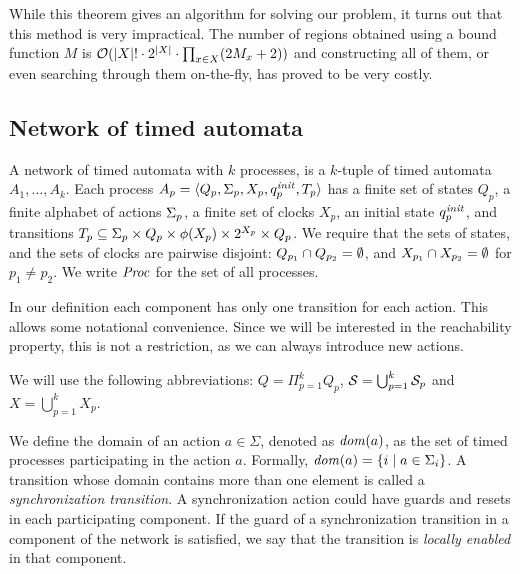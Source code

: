 While this theorem gives an algorithm for solving our problem, it turns out that this method is very impractical. The number of regions obtained using a bound function $M$ is $\calO (|X|! \cdot 2^{|X|} \cdot \prod_{x \in X} (2M_x + 2))$ \cite{} and constructing all of them, or even searching through them on-the-fly, has proved to be very costly.

\subsection{Network of timed automata}

\begin{definition}\label{df:network}
    A network of timed automata with $k$ processes, is a $k$-tuple of
    timed automata $A_1,\dots,A_k$.  Each process
    $A_p=\struct{Q_p,\S_p,X_p,q^\init_p,T_p}$ has a finite set of states
    $Q_p$, a finite alphabet of actions $\S_p$, a finite set of clocks
    $X_p$, an initial state $q^\init_p$, and transitions
    $T_p\incl\S_p\times Q_p\times \phi(X_p)\times 2^{X_p}\times Q_p$.  We
    require that the sets of states, and the sets of clocks are pairwise
    disjoint: $Q_{p_1}\cap Q_{p_2}=\es$, and $X_{p_1}\cap X_{p_2}=\es$
    for $p_1\not=p_2$. We write $\Proc$ for the set of all processes.
  \end{definition}
  
  \begin{remark}
    In our definition each component has only one transition for each action. This allows some notational convenience. Since we will be interested in the reachability property, this is not a restriction, as we can always introduce new actions.
  \end{remark}

  We will use the following abbreviations: $Q=\Pi_{p=1}^k Q_p$, $\Ss=\bigcup_{p=1}^k \Ss_p$ and $X=\bigcup_{p=1}^k X_p$.
    
  We define the domain of an action $a \in \Sigma$, denoted as $\dom(a)$, as
  the set of timed processes participating
  in the action $a$.
  Formally, $\dom(a) = \{i \mid a \in \Sigma_i\}$.
  A transition whose domain contains more than one element is called a
  \emph{synchronization transition}.
  A synchronization action could have guards and resets in each participating component.
  If the guard of a synchronization transition in a component of the network
  is satisfied, we say that the transition is \emph{locally enabled} in that
  component.
  
